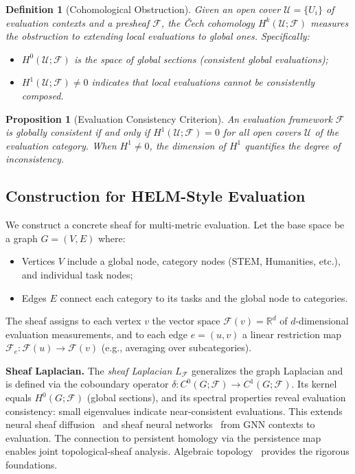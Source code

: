 \documentclass[11pt]{article}
\newtheorem{definition}[theorem]{Definition}
\newtheorem{proposition}[theorem]{Proposition}
\newcommand{\R}{\mathbb{R}}
\newcommand{\cF}{\mathcal{F}}
\newcommand{\cU}{\mathcal{U}}
\begin{document}
\begin{definition}[Cohomological Obstruction]
Given an open cover $\cU = \{U_i\}$ of evaluation contexts and a presheaf $\cF$, the \emph{\v{C}ech cohomology} $H^k(\cU; \cF)$ measures the obstruction to extending local evaluations to global ones. Specifically:
\begin{itemize}
\item $H^0(\cU; \cF)$ is the space of global sections (consistent global evaluations);
\item $H^1(\cU; \cF) \neq 0$ indicates that local evaluations \emph{cannot} be consistently composed.
\end{itemize}
\end{definition}

\begin{proposition}[Evaluation Consistency Criterion]
An evaluation framework $\cF$ is \emph{globally consistent} if and only if $H^1(\cU; \cF) = 0$ for all open covers $\cU$ of the evaluation category. When $H^1 \neq 0$, the dimension of $H^1$ quantifies the degree of inconsistency.
\end{proposition}

\subsection{Construction for HELM-Style Evaluation}

We construct a concrete sheaf for multi-metric evaluation. Let the base space be a graph $G = (V, E)$ where:
\begin{itemize}
\item Vertices $V$ include a global node, category nodes (STEM, Humanities, etc.), and individual task nodes;
\item Edges $E$ connect each category to its tasks and the global node to categories.
\end{itemize}

The sheaf assigns to each vertex $v$ the vector space $\cF(v) = \R^d$ of $d$-dimensional evaluation measurements, and to each edge $e = (u, v)$ a linear restriction map $\cF_e: \cF(u) \to \cF(v)$ (e.g., averaging over subcategories).

\textbf{Sheaf Laplacian.} The \emph{sheaf Laplacian} $L_\cF$ generalizes the graph Laplacian and is defined via the coboundary operator $\delta: C^0(G; \cF) \to C^1(G; \cF)$. Its kernel equals $H^0(G; \cF)$ (global sections), and its spectral properties reveal evaluation consistency: small eigenvalues indicate near-consistent evaluations. This extends neural sheaf diffusion~\cite{bodnar2022neural} and sheaf neural networks~\cite{hansen2019sheaf} from GNN contexts to evaluation. The connection to persistent homology via the persistence map~\cite{curry2018fiber} enables joint topological-sheaf analysis. Algebraic topology~\cite{hatcher2002algebraic,munkres2018elements} provides the rigorous foundations.
\end{document}
